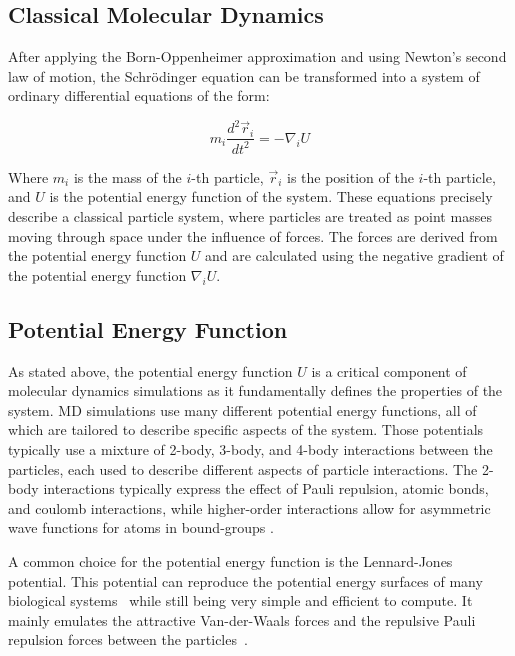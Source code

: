 \subsection{Classical Molecular Dynamics}

After applying the Born-Oppenheimer approximation and using Newton's second law of motion, the Schrödinger equation can be transformed into a system of ordinary differential equations of the form:

\begin{equation}
      m_i \frac{d^2 \vec{r}_i}{dt^2} = -\nabla_i U
\end{equation}

Where $m_i$ is the mass of the $i$-th particle, $\vec{r}_i$ is the position of the $i$-th particle, and $U$ is the potential energy function of the system. These equations precisely describe a classical particle system, where particles are treated as point masses moving through space under the influence of forces. The forces are derived from the potential energy function $U$ and are calculated using the negative gradient of the potential energy function $\nabla_i U$.

\subsection{Potential Energy Function}

As stated above, the potential energy function $U$ is a critical component of molecular dynamics simulations as it fundamentally defines the properties of the system. MD simulations use many different potential energy functions, all of which are tailored to describe specific aspects of the system. Those potentials typically use a mixture of 2-body, 3-body, and 4-body interactions between the particles, each used to describe different aspects of particle interactions. The 2-body interactions typically express the effect of Pauli repulsion, atomic bonds, and coulomb interactions, while higher-order interactions allow for asymmetric wave functions for atoms in bound-groups \cite{Leimkuhler2015}.

A common choice for the potential energy function is the Lennard-Jones potential. This potential can reproduce the potential energy surfaces of many biological systems~\cite{NexusPhysicsLennardJones} while still being very simple and efficient to compute. It mainly emulates the attractive Van-der-Waals forces and the repulsive Pauli repulsion forces between the particles~\cite{ChemieLexikonLennardJones}.

